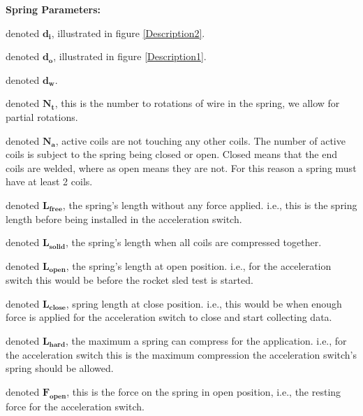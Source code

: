 \documentclass[10pt]{article}
\begin{document}
		\noindent \textbf{Spring Parameters:}
		\begin{description}[leftmargin=!,labelwidth=\widthof{\bfseries Ultimate torsional stress:}]
			\item [Inner diameter:] denoted $\mathbf{d_{i}}$, illustrated in figure \ref{Description2}.
			
			\item [Outer diameter:] denoted $\mathbf{d_{o}}$, illustrated in figure \ref{Description1}.
			
			\item [Wire diameter:] denoted $\mathbf{d_{w}}$.
			
			\item[Total coils:] denoted $\mathbf{N_{t}}$, this is the number to rotations of wire in the spring, we allow for partial rotations.
			
			\item[Active coils:] denoted $\mathbf{N_{a}}$, active coils are not touching any other coils. The number of active coils is subject to the spring being closed or open. Closed means that the end coils are welded, where as open means they are not. For this reason a spring must have at least 2 coils.

			\item[Free length:] denoted $\mathbf{L_{free}}$, the spring's length without any force applied. i.e., this is the spring length before being installed in the acceleration switch.
			
			\item[Solid length:] denoted $\mathbf{L_{solid}}$, the spring's length when all coils are compressed together.
			\item[Open length:] denoted $\mathbf{L_{open}}$, the spring's length at open position. i.e., for the acceleration switch this would be before the rocket sled test is started. 
			
			\item[Close length:] denoted $\mathbf{L_{close}}$, spring length at close position. i.e., this would be when enough force is applied for the acceleration switch to close and start collecting data.
			
			\item[Hard length:] denoted $\mathbf{L_{hard}}$, the maximum a spring can compress for the application. i.e., for the acceleration switch this is the maximum compression the acceleration switch's spring should be allowed. 
			
			\item[Open force:] denoted $\mathbf{F_{open}}$, this is the force on the spring in open position, i.e., the resting force for the acceleration switch.
					

\end{description}
\end{document}
